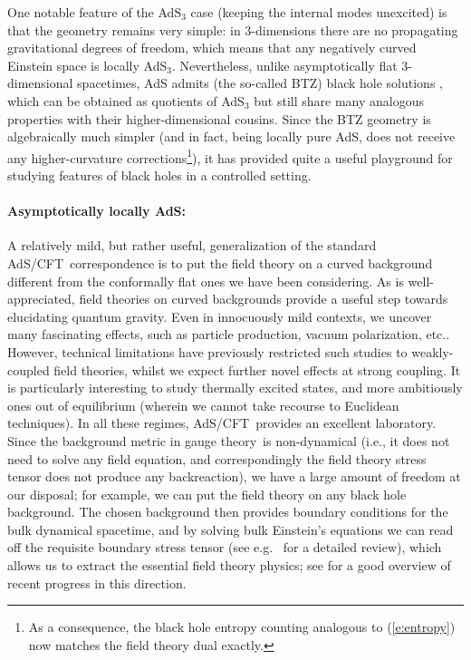 \documentclass[12pt,a4paper]{article}
\def\req#1{(\ref{#1})}
\def\AC{AdS/CFT}
\def\GT{gauge theory}
\begin{document}
One notable feature of the AdS$_3$ case (keeping the internal modes unexcited) is that the geometry remains very simple:  in 3-dimensions there are no propagating gravitational degrees of freedom, which means that any negatively curved Einstein space is locally AdS$_3$.  Nevertheless, unlike asymptotically flat 3-dimensional  spacetimes, AdS admits (the so-called BTZ) black hole solutions \cite{Banados:1992wn}, which can be obtained as quotients of AdS$_3$ but still share  many analogous properties with their higher-dimensional cousins.  Since the BTZ geometry is algebraically much simpler (and in fact, being locally pure AdS, does not receive any higher-curvature corrections\footnote{
As a consequence, the black hole entropy counting analogous to \req{e:entropy} now matches the field theory dual exactly.
}), it has provided quite a useful playground for studying features of black holes in a controlled setting.

\paragraph{Asymptotically locally AdS:}  %
A relatively mild, but rather useful, generalization of the standard \AC\ correspondence is to put the field theory on a curved background different from the conformally flat ones we have been considering. 
As is well-appreciated, field theories on curved backgrounds provide a useful step towards  elucidating quantum gravity.  Even in innocuously mild contexts, we uncover many fascinating effects, such as particle production, vacuum polarization, etc..  However, technical limitations have previously restricted such studies to weakly-coupled field theories, whilst we expect further novel effects at strong coupling.  It is particularly interesting to study thermally excited states, and more ambitiously ones out of equilibrium (wherein we cannot take recourse to Euclidean techniques).  In all these regimes, \AC\ provides an excellent laboratory.  Since the background metric in \GT\ is non-dynamical (i.e., it does not need to solve any field equation, and correspondingly the field theory stress tensor does not produce any  backreaction), we have a large amount of freedom at our disposal; for example, we can put the field theory on any black hole background.  The chosen background then provides boundary conditions for the bulk dynamical spacetime, and by solving bulk Einstein's equations we can read off the requisite boundary stress tensor (see e.g.\ \cite{Fischetti:2012rd} for a detailed review), which allows us to extract the essential field theory physics; see \cite{Marolf:2013ioa} for a good overview of recent progress in this direction.
\end{document}
